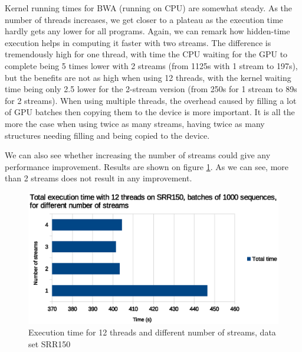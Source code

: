 Kernel running times for BWA (running on CPU) are somewhat steady. As the number of threads increases, we get closer to a plateau as the execution time hardly gets any lower for all programs. Again, we can remark how hidden-time execution helps in computing it faster with two streams. The difference is tremendously high for one thread, with time the CPU waiting for the GPU to complete being 5 times lower with 2 streams (from 1125s with 1 stream to 197s), but the benefits are not as high when using 12 threads, with the kernel waiting time being only 2.5 lower for the 2-stream version (from 250s for 1 stream to 89s for 2 streams). When using multiple threads, the overhead caused by filling a lot of GPU batches then copying them to the device is more important. It is all the more the case when using twice as many streams, having twice as many structures needing filling and being copied to the device.

We can also see whether increasing the number of streams could give any performance improvement. Results are shown on figure \ref{fig:exec-time-nbstreams}. As we can see, more than 2 streams does not result in any improvement. 

\begin{figure}[h]
	\centering
	\includegraphics[width=0.9\linewidth]{exec-time-nbstreams}
	\caption{Execution time for 12 threads and different number of streams, data set SRR150}
	\label{fig:exec-time-nbstreams}
\end{figure}

